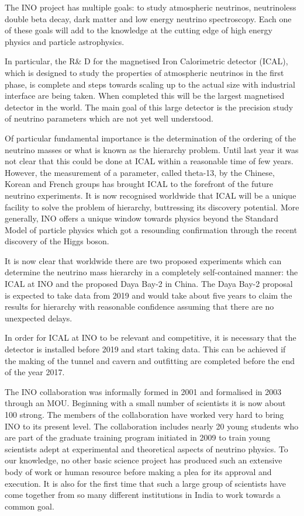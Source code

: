 The INO project has multiple goals: to study atmospheric neutrinos,
neutrinoless double beta decay, dark matter and low energy neutrino
spectroscopy. Each one of these goals will add to the knowledge at the
cutting edge of high energy physics and particle astrophysics.

In particular, the R\& D for the magnetised Iron Calori\-metric detector
(ICAL), which is designed to study the properties of atmospheric neutrinos
in the first phase, is complete and steps towards scaling up to the
actual size with industrial interface are being taken. When completed
this will be the largest magnetised detector in the world. The main goal
of this large detector is the precision study of neutrino parameters
which are not yet well understood.

Of particular fundamental importance is the determination of the ordering
of the neutrino masses or what is known as the hierar\-chy problem. Until
last year it was not clear that this could be done at ICAL within a
reasonable time of few years. However, the measurement of a parameter,
called theta-13, by the Chinese, Korean and French groups has brought ICAL
to the forefront of the future neutrino experiments. It is now recognised
worldwide that ICAL will be a unique facility to solve the pro\-blem of
hierarchy, buttressing its discovery potential. More ge\-nerally, INO offers
a unique window towards physics beyond the Standard Model of particle
physics which got a resounding confirmation through the recent discovery
of the Higgs boson.

It is now clear that worldwide there are two proposed experi\-ments which
can determine the neutrino mass hierarchy in a completely self-contained
manner: the ICAL at INO and the proposed Daya Bay-2 in China. The Daya
Bay-2 proposal is expecte\-d to take data from 2019 and would take about
five years to claim the results for hierarchy with reasonable confidence
assuming that there are no unexpected delays.

In order for ICAL at INO to be relevant and competitive, it is necessary
that the detector is installed before 2019 and start taking data. This
can be achieved if the making of the tunnel and cavern and outfitting
are completed before the end of the year 2017.

The INO collaboration was informally formed in 2001 and formalised in 2003
through an MOU. Beginning with a small number of scientists it is now
about 100 strong. The members of the collaboration have worked very hard
to bring INO to its present level. The collaboration includes nearly 20
young students who are part of the graduate training program initiated in
2009 to train young scientists adept at experimental and theoretical
aspects of neutrino physics. To our knowledge, no other basic scie\-nce
project has produced such an extensive body of work or human resource
before making a plea for its approval and execution. It is also
for the first time that such a large group of scientists have come
together from so many different institutions in India to work towards
a common goal.


